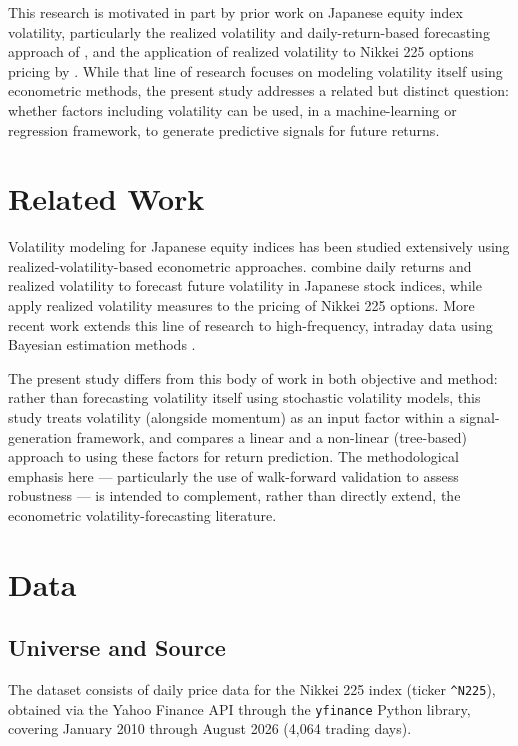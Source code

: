 \documentclass[11pt]{article}
\begin{document}
This research is motivated in part by prior work on Japanese equity index volatility, particularly the realized volatility and daily-return-based forecasting approach of \citet{takahashi2024forecasting}, and the application of realized volatility to Nikkei 225 options pricing by \citet{ubukata2011pricing}. While that line of research focuses on modeling volatility itself using econometric methods, the present study addresses a related but distinct question: whether factors including volatility can be used, in a machine-learning or regression framework, to generate predictive signals for future returns.

\section{Related Work}

Volatility modeling for Japanese equity indices has been studied extensively using realized-volatility-based econometric approaches. \citet{takahashi2024forecasting} combine daily returns and realized volatility to forecast future volatility in Japanese stock indices, while \citet{ubukata2011pricing} apply realized volatility measures to the pricing of Nikkei 225 options. More recent work extends this line of research to high-frequency, intraday data using Bayesian estimation methods \citep{watanabe2023highfrequency}.

The present study differs from this body of work in both objective and method: rather than forecasting volatility itself using stochastic volatility models, this study treats volatility (alongside momentum) as an input factor within a signal-generation framework, and compares a linear and a non-linear (tree-based) approach to using these factors for return prediction. The methodological emphasis here --- particularly the use of walk-forward validation to assess robustness --- is intended to complement, rather than directly extend, the econometric volatility-forecasting literature.

\section{Data}

\subsection{Universe and Source}
The dataset consists of daily price data for the Nikkei 225 index (ticker \texttt{\^{}N225}), obtained via the Yahoo Finance API through the \texttt{yfinance} Python library, covering January 2010 through August 2026 (4{,}064 trading days).
\end{document}
